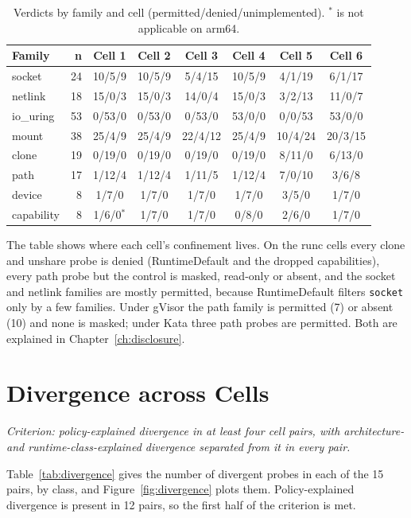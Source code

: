 \begin{table}[htbp]
\centering\small
\begin{tabular}{@{}lrcccccc@{}}
\toprule
\textbf{Family} & \textbf{n} & \textbf{Cell 1} & \textbf{Cell 2} & \textbf{Cell 3} & \textbf{Cell 4} & \textbf{Cell 5} & \textbf{Cell 6} \\
\midrule
socket & 24 & 10/5/9 & 10/5/9 & 5/4/15 & 10/5/9 & 4/1/19 & 6/1/17 \\
netlink & 18 & 15/0/3 & 15/0/3 & 14/0/4 & 15/0/3 & 3/2/13 & 11/0/7 \\
io\_uring & 53 & 0/53/0 & 0/53/0 & 0/53/0 & 53/0/0 & 0/0/53 & 53/0/0 \\
mount & 38 & 25/4/9 & 25/4/9 & 22/4/12 & 25/4/9 & 10/4/24 & 20/3/15 \\
clone & 19 & 0/19/0 & 0/19/0 & 0/19/0 & 0/19/0 & 8/11/0 & 6/13/0 \\
path & 17 & 1/12/4 & 1/12/4 & 1/11/5 & 1/12/4 & 7/0/10 & 3/6/8 \\
device & 8 & 1/7/0 & 1/7/0 & 1/7/0 & 1/7/0 & 3/5/0 & 1/7/0 \\
capability & 8 & 1/6/0$^{*}$ & 1/7/0 & 1/7/0 & 0/8/0 & 2/6/0 & 1/7/0 \\
\bottomrule
\end{tabular}
\caption{Verdicts by family and cell (permitted/denied/unimplemented). $^{*}$ is not applicable on arm64.}
\label{tab:family-verdicts}
\end{table}

The table shows where each cell's confinement lives. On the runc cells every clone and unshare probe is denied (RuntimeDefault and the dropped capabilities), every path probe but the control is masked, read-only or absent, and the socket and netlink families are mostly permitted, because RuntimeDefault filters \texttt{socket} only by a few families. Under gVisor the path family is permitted (7) or absent (10) and none is masked; under Kata three path probes are permitted. Both are explained in Chapter~\ref{ch:disclosure}.

\section{Divergence across Cells}
\label{sec:res-divergence}

\emph{Criterion: policy-explained divergence in at least four cell pairs, with architecture- and runtime-class-explained divergence separated from it in every pair.}

Table~\ref{tab:divergence} gives the number of divergent probes in each of the 15 pairs, by class, and Figure~\ref{fig:divergence} plots them. Policy-explained divergence is present in 12 pairs, so the first half of the criterion is met.

